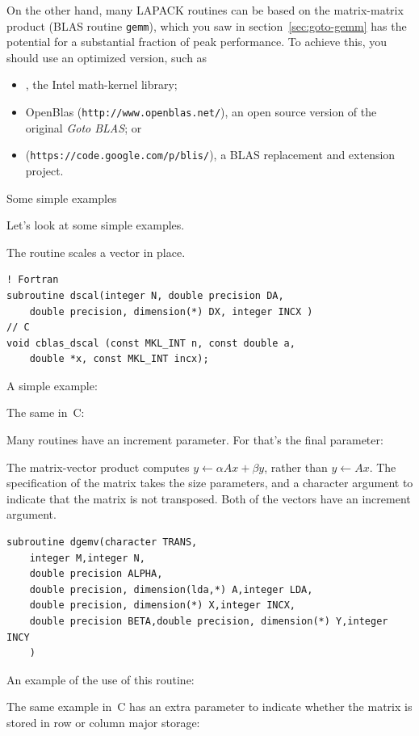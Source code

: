 On the other hand, many LAPACK routines can be based on
the matrix-matrix product (BLAS routine \texttt{gemm}),
which you saw in section~\ref{sec:goto-gemm} has the potential
for a substantial fraction of peak performance. To achieve
this, you should use an optimized version, such as
\begin{itemize}
\item {}, the Intel math-kernel library;
\item OpenBlas (\texttt{http://www.openblas.net/}), an open source
  version of the original \emph{Goto BLAS}; or
\item {} (\texttt{https://code.google.com/p/blis/}), a BLAS replacement and
  extension project.
\end{itemize}

 {Some simple examples}

Let's look at some simple examples.

The routine  scales a vector in place.
\begin{verbatim}
! Fortran
subroutine dscal(integer N, double precision DA,
    double precision, dimension(*) DX, integer INCX )  
// C
void cblas_dscal (const MKL_INT n, const double a, 
    double *x, const MKL_INT incx);
\end{verbatim}
A simple example:
%

The same in~C:
%

Many routines have an increment parameter. For  that's the final parameter:
%

The matrix-vector product  computes $y\leftarrow \alpha Ax+\beta y$,
rather than $y\leftarrow Ax$.
The specification of the matrix takes the  size parameters,
and a character argument  to indicate that the matrix is not transposed.
Both of the vectors have an increment argument.
\begin{verbatim}
subroutine dgemv(character TRANS,
    integer M,integer N,
    double precision ALPHA,
    double precision, dimension(lda,*) A,integer LDA,
    double precision, dimension(*) X,integer INCX,
    double precision BETA,double precision, dimension(*) Y,integer INCY
    )
\end{verbatim}
An example of the use of this routine:
%

The same example in~C has an extra parameter to indicate whether the matrix
is stored in row or column major storage:
%


